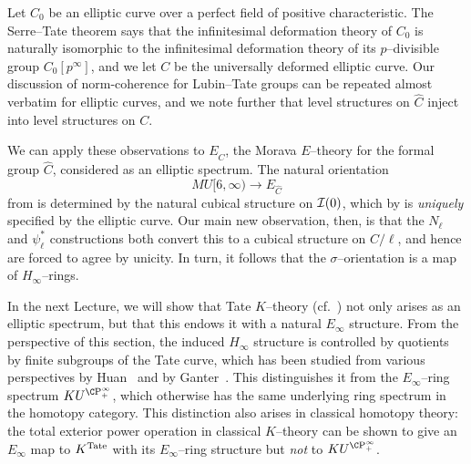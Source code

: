 \begin{example}
Let \(C_0\) be an elliptic curve over a perfect field of positive characteristic.  The Serre--Tate theorem says that the infinitesimal deformation theory of \(C_0\) is naturally isomorphic to the infinitesimal deformation theory of its \(p\)--divisible group \(C_0[p^\infty]\), and we let \(C\) be the universally deformed elliptic curve.  Our discussion of norm-coherence for Lubin--Tate groups can be repeated almost verbatim for elliptic curves, and we note further that level structures on \(\widehat C\) inject into level structures on \(C\).

We can apply these observations to \(E_{\widehat C}\), the Morava \(E\)--theory for the formal group \(\widehat C\), considered as an elliptic spectrum.  The natural orientation \[MU[6, \infty) \to E_{\widehat C}\] from  is determined by the natural cubical structure on \(\mathcal{I}(0)\), which by  is \emph{uniquely} specified by the elliptic curve.  Our main new observation, then, is that the \(N_\ell\) and \(\psi_\ell^*\) constructions both convert this to a cubical structure on \(C / \ell\), and hence are forced to agree by unicity.  In turn, it follows that the \(\sigma\)--orientation is a map of \(H_\infty\)--rings.
\end{example}

\begin{remark}
In the next Lecture, we will show that Tate \(K\)--theory (cf.\ ) not only arises as an elliptic spectrum, but that this endows it with a natural \(E_\infty\) structure.  From the perspective of this section, the induced \(H_\infty\) structure is controlled by quotients by finite subgroups of the Tate curve, which has been studied from various perspectives by Huan~\cite{Huan} and by Ganter~\cite{GanterStringyOpns,GanterPowerOpnsInTateKthy}.  This distinguishes it from the \(E_\infty\)--ring spectrum \(KU^{\CP^\infty_+}\), which otherwise has the same underlying ring spectrum in the homotopy category.  This distinction also arises in classical homotopy theory: the total exterior power operation in classical \(K\)--theory can be shown to give an \(E_\infty\) map to \(K^{\mathrm{Tate}}\) with its \(E_\infty\)--ring structure but \emph{not} to \(KU^{\CP^\infty_+}\).
\end{remark}
















